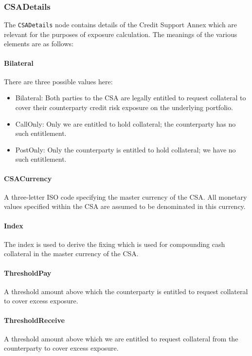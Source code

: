 \subsubsection*{CSADetails}

The \lstinline!CSADetails! node contains details of the Credit Support
Annex which are relevant for the purposes of exposure calculation. The
meanings of the various elements are as follows:

\paragraph*{Bilateral} There are three possible values here:
\begin{itemize}
\item Bilateral: Both parties to the CSA are legally entitled to
  request collateral to cover their counterparty credit risk exposure
  on the underlying portfolio.
\item CallOnly: Only we are entitled to hold collateral; the
  counterparty has no such entitlement.
\item PostOnly: Only the counterparty is entitled to hold collateral;
  we have no such entitlement.
\end{itemize}

\paragraph*{CSACurrency} A three-letter ISO code specifying the master
currency of the CSA. All monetary values specified within the CSA are
assumed to be denominated in this currency.

\paragraph*{Index} The index is used to derive the fixing which is used
for compounding cash collateral in the master currency of the CSA.

\paragraph*{ThresholdPay} A threshold amount above which the
counterparty is entitled to request collateral to cover excess
exposure.

\paragraph*{ThresholdReceive} A threshold amount above which we are
entitled to request collateral from the counterparty to cover excess
exposure.

